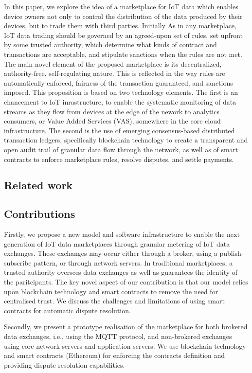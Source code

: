 \documentclass[conference]{IEEEtran}
\begin{document}
In this paper, we explore the idea of a marketplace for IoT data which enables device owners not only to control the distribution of the data produced by their devices, but to trade them with third parties.
Initially 
As in any marketplace, IoT data trading should be governed by an agreed-upon set of rules, set upfront by some trusted authority, which determine what kinds of contract and transactions are acceptable, and stipulate sanctions when the rules are not met.
The main novel element of the proposed marketplace is its decentralized, authority-free,  self-regulating nature. This is reflected in the way rules are automatically enforced,  fairness of the transaction guaranteed, and sanctions imposed. This proposition is based on two technology elements. The first is an ehancement to IoT inrastructure, to enable the systematic monitoring of data streams as they flow from devices at the edge of the nework to analytics consumers, or Value Added Services (VAS), somewhere in the core cloud infrastructure.
The second is the use of emerging consensus-based distributed transaction ledgers, specifically blockchain technology to create a transparent and open audit trail of granular data flow through the network, as well as of smart contracts to enforce marketplace rules, resolve disputes, and settle payments.

\subsection{Related work}


\subsection{Contributions}

Firstly, we propose a new model and software infrastructure to enable the next generation of IoT data marketplaces through granular metering of IoT data exchanges. These exchanges may occur either through a broker, using a publish-subscribe pattern, or through network servers.
In traditional marketplaces, a trusted authority oversees data exchanges as well as guarantees the identity of the paritcipants. The key novel aspect of our contribution is that our model relies upon blockchain technology and smart contracts to remove the need for centralised trust. We discuss the challenges and limitations of using smart contracts for automatic dispute resolution.

Secondly, we present a prototype realisation of the marketplace for both brokered data exchanges, i.e., using the MQTT protocol, and non-brokered exchanges using core network servers and application servers. We use blockchain technology and smart contracts (Ethereum) for enforcing the contracts definition and providing dispute resolution capabilities.
\end{document}
